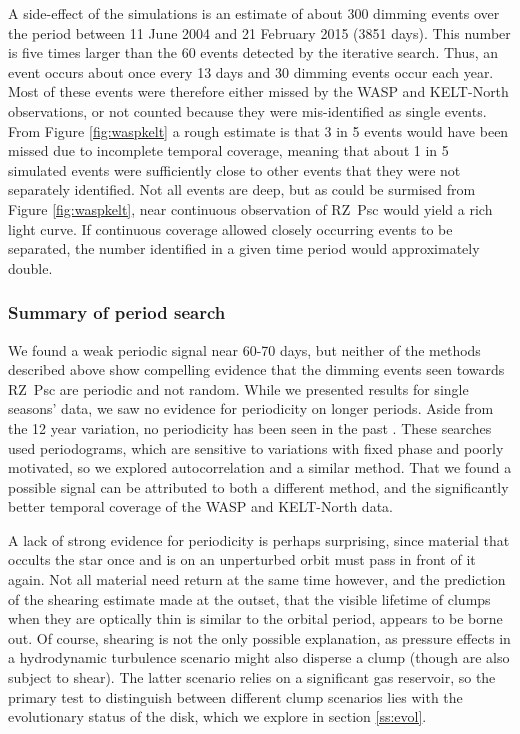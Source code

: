 \documentclass[]{rsos}
\begin{document}
A side-effect of the simulations is an estimate of about 300 dimming events over the
period between 11 June 2004 and 21 February 2015 (3851 days). This number is five times
larger than the 60 events detected by the iterative search. Thus, an event occurs about
once every 13 days and 30 dimming events occur each year. Most of these events were
therefore either missed by the WASP and KELT-North observations, or not counted because they
were mis-identified as single events. From Figure \ref{fig:waspkelt} a rough estimate is
that 3 in 5 events would have been missed due to incomplete temporal coverage, meaning
that about 1 in 5 simulated events were sufficiently close to other events that they were
not separately identified. Not all events are deep, but as could be surmised from Figure
\ref{fig:waspkelt}, near continuous observation of RZ~Psc would yield a rich light
curve. If continuous coverage allowed closely occurring events to be separated, the
number identified in a given time period would approximately double.

\subsubsection{Summary of period search}\label{sss:persum}

We found a weak periodic signal near 60-70 days, but neither of the methods described
above show compelling evidence that the dimming events seen towards RZ~Psc are periodic
and not random. While we presented results for single seasons' data, we saw no evidence
for periodicity on longer periods. Aside from the 12 year variation, no periodicity has
been seen in the past \cite{2013A&A...553L...1D}. These searches used periodograms,
which are sensitive to variations with fixed phase and poorly motivated, so we explored
autocorrelation and a similar method. That we found a possible signal can be attributed
to both a different method, and the significantly better temporal coverage of the WASP
and KELT-North data.

A lack of strong evidence for periodicity is perhaps surprising, since material that
occults the star once and is on an unperturbed orbit must pass in front of it again. Not
all material need return at the same time however, and the prediction of the shearing
estimate made at the outset, that the visible lifetime of clumps when they are optically
thin is similar to the orbital period, appears to be borne out. Of course, shearing is
not the only possible explanation, as pressure effects in a hydrodynamic turbulence
scenario might also disperse a clump (though are also subject to shear). The latter
scenario relies on a significant gas reservoir, so the primary test to distinguish
between different clump scenarios lies with the evolutionary status of the disk, which we
explore in section \ref{ss:evol}.
\end{document}
